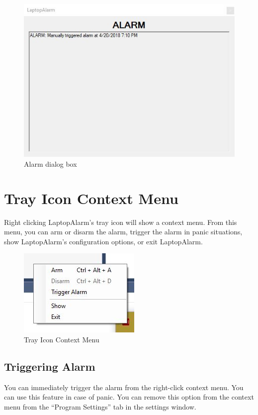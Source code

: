 \documentclass[12pt, letterpaper]{article}
\begin{document}
\begin{figure}[H]
  \caption{Alarm dialog box}
  \centering
    \includegraphics{figures/figure05.JPG}
\end{figure}

\section{Tray Icon Context Menu}
Right clicking LaptopAlarm's tray icon will show a context menu. From this menu, you can arm or disarm the alarm, trigger the alarm in panic situations, show LaptopAlarm's configuration options, or exit LaptopAlarm.

\begin{figure}[H]
  \caption{Tray Icon Context Menu}
  \centering
    \includegraphics{figures/figure03.JPG}
\end{figure}

\subsection{Triggering Alarm}
You can immediately trigger the alarm from the right-click context menu. You can use this feature in case of panic. You can remove this option from the context menu from the ``Program Settings'' tab in the settings window.
\end{document}
